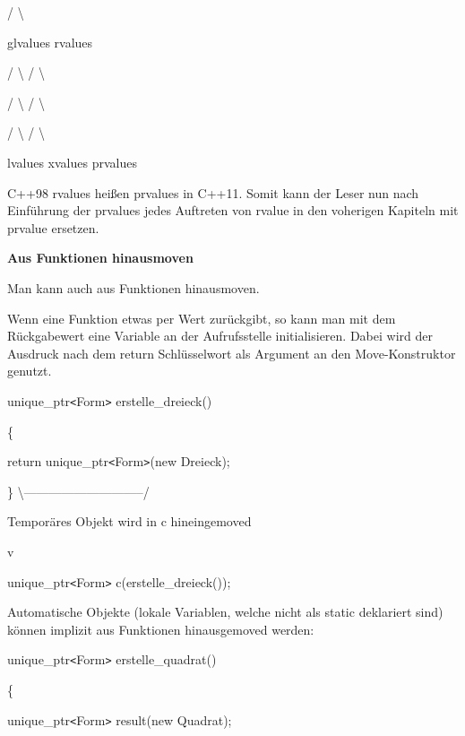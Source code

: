 \documentclass{article}
\begin{document}
\parindent=28pt
/         \textbackslash{}    

\parindent=14pt
glvalues   rvalues      

\parindent=21pt
/  \textbackslash{}       /  \textbackslash{}     

\parindent=18pt
/    \textbackslash{}     /    \textbackslash{}    

\parindent=14pt
/      \textbackslash{}   /      \textbackslash{}

\parindent=0pt
lvalues   xvalues   prvalues

\vspace{12pt}
C++98 rvalues heißen prvalues in C++11. Somit kann der Leser nun nach Einführung 
der prvalues jedes Auftreten von rvalue in den voherigen Kapiteln mit prvalue ersetzen.

\vspace{12pt}
\textbf{Aus Funktionen hinausmoven}

Man kann auch aus Funktionen hinausmoven.

Wenn eine Funktion etwas per Wert zurückgibt, so kann man mit dem Rückgabewert 
eine Variable an der Aufrufsstelle initialisieren. Dabei wird der Ausdruck nach 
dem return Schlüsselwort als Argument an den Move-Konstruktor genutzt.

unique\_ptr\texttt{<}Form\texttt{>} erstelle\_dreieck()

\{    

\parindent=14pt
return unique\_ptr\texttt{<}Form\texttt{>}(new Dreieck);

\parindent=0pt
\}          \textbackslash{}-----------------------------/                  

\parindent=64pt
\textbar{}                  

\textbar{} Temporäres Objekt wird in c hineingemoved                  

\textbar{}                  

\parindent=129pt
v

\parindent=0pt
unique\_ptr\texttt{<}Form\texttt{>} c(erstelle\_dreieck());

Automatische Objekte (lokale Variablen, welche nicht als static deklariert sind) 
können implizit aus Funktionen hinausgemoved werden:

unique\_ptr\texttt{<}Form\texttt{>} erstelle\_quadrat()

\{    

\parindent=14pt
unique\_ptr\texttt{<}Form\texttt{>} result(new Quadrat);    
\end{document}
